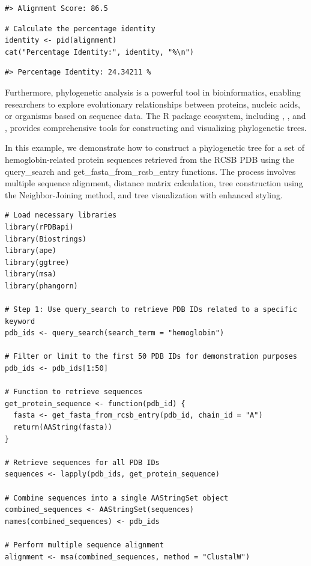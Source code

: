 \begin{verbatim}
#> Alignment Score: 86.5
\end{verbatim}

\begin{verbatim}
# Calculate the percentage identity
identity <- pid(alignment)
cat("Percentage Identity:", identity, "%\n")
\end{verbatim}

\begin{verbatim}
#> Percentage Identity: 24.34211 %
\end{verbatim}

Furthermore, phylogenetic analysis is a powerful tool in bioinformatics, enabling researchers to explore evolutionary relationships between proteins, nucleic acids, or organisms based on sequence data. The R package ecosystem, including , , and , provides comprehensive tools for constructing and visualizing phylogenetic trees.

In this example, we demonstrate how to construct a phylogenetic tree for a set of hemoglobin-related protein sequences retrieved from the RCSB PDB using the query\_search and get\_fasta\_from\_rcsb\_entry functions. The process involves multiple sequence alignment, distance matrix calculation, tree construction using the Neighbor-Joining method, and tree visualization with enhanced styling.

\begin{verbatim}
# Load necessary libraries
library(rPDBapi)
library(Biostrings)
library(ape)
library(ggtree)
library(msa)
library(phangorn)

# Step 1: Use query_search to retrieve PDB IDs related to a specific keyword
pdb_ids <- query_search(search_term = "hemoglobin")

# Filter or limit to the first 50 PDB IDs for demonstration purposes
pdb_ids <- pdb_ids[1:50]

# Function to retrieve sequences
get_protein_sequence <- function(pdb_id) {
  fasta <- get_fasta_from_rcsb_entry(pdb_id, chain_id = "A")
  return(AAString(fasta))
}

# Retrieve sequences for all PDB IDs
sequences <- lapply(pdb_ids, get_protein_sequence)

# Combine sequences into a single AAStringSet object
combined_sequences <- AAStringSet(sequences)
names(combined_sequences) <- pdb_ids

# Perform multiple sequence alignment
alignment <- msa(combined_sequences, method = "ClustalW")
\end{verbatim}

